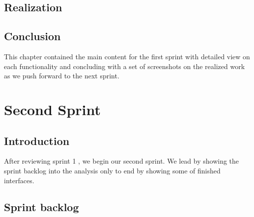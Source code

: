 \documentclass[]{report}
\begin{document}
\section{Realization}

\section{Conclusion}
This chapter contained the main content for the first sprint with detailed view on each functionality and concluding with a set of screenshots on the realized work as we push forward to the next sprint.


\chapter{Second Sprint}
\section{Introduction}
After reviewing sprint 1 , we begin our second sprint. We lead by showing the sprint backlog into the analysis only to end by showing some of finished interfaces.

\section{Sprint backlog}
\end{document}
